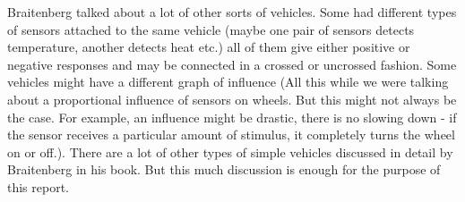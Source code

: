     Braitenberg talked about a lot of other sorts of vehicles. Some had different types of sensors attached to the same vehicle (maybe one pair of sensors detects temperature, another detects heat etc.) all of them give either positive or negative responses and may be connected in a crossed or uncrossed fashion. Some vehicles might have a different graph of influence (All this while we were talking about a proportional influence of sensors on wheels. But this might not always be the case. For example, an influence might be drastic, there is no slowing down - if the sensor receives a particular amount of stimulus, it completely turns the wheel on or off.). There are a lot of other types of simple vehicles discussed in detail by Braitenberg in his book. But this much discussion is enough for the purpose of this report.

